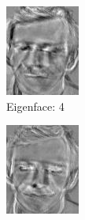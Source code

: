 \documentclass[12pt]{article}
\begin{document}
\begin{figure}
\begin{subfigure}[b]{0.20\textwidth}
		\includegraphics[width=\textwidth]{Task4.3_Images/PrincipalComponent4.jpg}
		\caption{Eigenface: 4}
	\end{subfigure}\quad
	\begin{subfigure}[b]{0.20\textwidth}
		\includegraphics[width=\textwidth]{Task4.3_Images/PrincipalComponent5.jpg}

\end{subfigure}
\end{figure}
\end{document}
